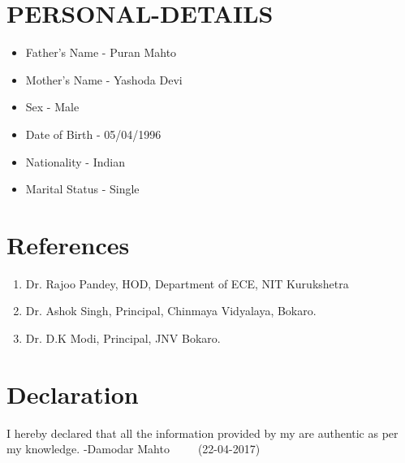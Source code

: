 \documentclass[11pt,a4paper,sans]{moderncv}
\begin{document}
\section{PERSONAL-DETAILS}
\begin{itemize}
\item Father's Name - Puran Mahto
\item Mother's Name - Yashoda Devi
\item Sex - Male
\item Date of Birth - 05/04/1996
\item Nationality - Indian
\item Marital Status - Single
\end{itemize}
\section{References}
\begin{enumerate}
\item Dr. Rajoo Pandey, HOD, Department of ECE, NIT Kurukshetra
\item Dr. Ashok Singh, Principal, Chinmaya Vidyalaya, Bokaro.
\item Dr. D.K Modi, Principal, JNV Bokaro.
\end{enumerate}
\section{Declaration}
I hereby declared that all the information provided by my are authentic as per my knowledge. 
\newline \newline     -Damodar Mahto\newline\ \ \ \ \ (22-04-2017)
\clearpage
\end{document}
